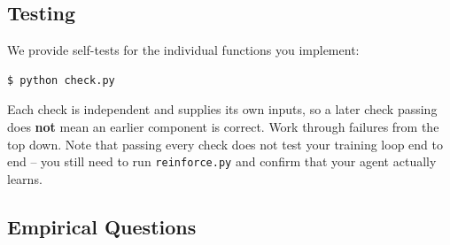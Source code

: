 \subsection{Testing}

We provide self-tests for the individual functions you implement:

\begin{lstlisting}[language=Shell]
$ python check.py
\end{lstlisting}

Each check is independent and supplies its own inputs, so a later check passing
does \textbf{not} mean an earlier component is correct. Work through failures from
the top down. Note that passing every check does not test your training loop end
to end -- you still need to run \verb|reinforce.py| and confirm that your agent
actually learns.

\subsection{Empirical Questions}
\label{sec:rl-empirical}

